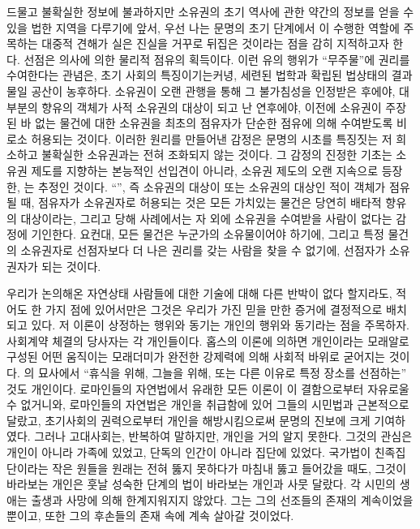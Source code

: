드물고 불확실한 정보에 불과하지만
소유권의 초기 역사에 관한 약간의 정보를 얻을 수 있을 법한 지역을 다루기에 앞서,
우선 나는
문명의 초기 단계에서 이 수행한 역할에 주목하는 대중적 견해가
실은 진실을 거꾸로 뒤집은 것이라는 점을 감히 지적하고자 한다.
선점은 의사에 의한 물리적 점유의 획득이다.
이런 유의 행위가 ``무주물''에 권리를 수여한다는 관념은,
초기 사회의 특징이기는커녕,
세련된 법학과 확립된 법상태의 결과물일 공산이 농후하다.
소유권이
오랜 관행을 통해
그 불가침성을
인정받은 후에야,
대부분의 향유의 객체가 사적 소유권의 대상이 되고 난 연후에야,
이전에 소유권이 주장된 바 없는 물건에 대한 소유권을
최초의 점유자가
단순한 점유에 의해
수여받도록
비로소
허용되는 것이다.
이러한 원리를 만들어낸 감정은
문명의 시초를 특징짓는
저 희소하고 불확실한 소유권과는 전혀 조화되지 않는 것이다.
그 감정의 진정한 기초는
소유권 제도를 지향하는 본능적인 선입견이 아니라,
소유권 제도의 오랜 지속으로 등장한,
는 추정인 것이다.
``'', 즉
소유권의 대상이 
또는 소유권의 대상인 적이 
객체가 점유될 때,
점유자가 소유권자로 허용되는 것은
모든 가치있는 물건은 당연히 배타적 향유의 대상이라는,
그리고
당해 사례에서는
자 외에 소유권을 수여받을 사람이 없다는 감정에
기인한다.
요컨대,
모든 물건은 누군가의 소유물이어야 하기에,
그리고
특정 물건의 소유권자로 선점자보다 더 나은 권리를 갖는
사람을 찾을 수 없기에,
선점자가 소유권자가 되는 것이다.

우리가 논의해온 자연상태 사람들에 대한 기술에 대해
다른 반박이 없다 할지라도,
적어도 한 가지 점에 있어서만은
그것은 우리가 가진 믿을 만한 증거에 결정적으로 배치되고 있다.
저 이론이 상정하는 행위와 동기는 개인의 행위와 동기라는 점을 주목하자.
사회계약 체결의 당사자는 각 개인들이다.
홉스의 이론에 의하면
개인이라는 모래알로 구성된 어떤 움직이는 모래더미가
완전한 강제력에 의해 사회적 바위로 굳어지는 것이다.
의 묘사에서
``휴식을 위해, 그늘을 위해, 또는 다른 이유로 특정 장소를 선점하는''
것도 개인이다.
로마인들의 자연법에서 유래한 모든 이론이
이 결함으로부터 자유로울 수 없거니와,
로마인들의 자연법은 개인을 취급함에 있어 그들의 시민법과 근본적으로 달랐고,
초기사회의 권력으로부터 개인을 해방시킴으로써
문명의 진보에 크게 기여하였다.
그러나 고대사회는, 반복하여 말하지만,
개인을 거의 알지 못한다.
그것의 관심은 개인이 아니라 가족에 있었고,
단독의 인간이 아니라 집단에 있었다.
국가법이 친족집단이라는 작은 원들을
원래는 전혀 뚫지 못하다가
마침내 뚫고 들어갔을 때도,
그것이 바라보는 개인은 훗날 성숙한 단계의 법이 바라보는 개인과
사뭇 달랐다.
각 시민의 생애는
출생과 사망에 의해 한계지워지지 않았다.
그는 그의 선조들의 존재의 계속이었을 뿐이고,
또한 그의 후손들의 존재 속에 계속 살아갈 것이었다.

